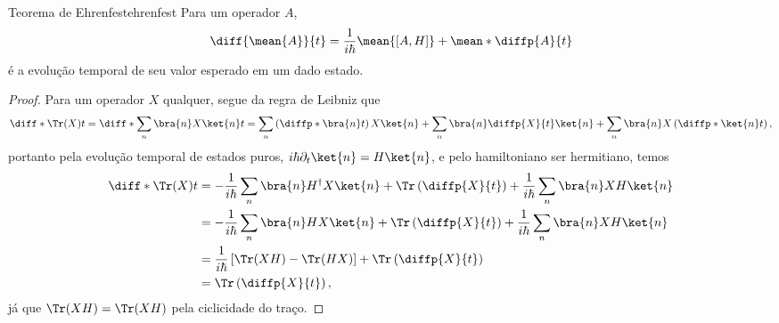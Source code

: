 \begin{theorem}{Teorema de Ehrenfest}{ehrenfest}
    Para um operador \(A\), 
    \begin{equation*}
       \diff{\mean{A}}{t} = \frac{1}{i \hbar} \mean{[A, H]} + \mean*{\diffp{A}{t}}
    \end{equation*}
    é a evolução temporal de seu valor esperado em um dado estado.
\end{theorem}
\begin{proof}
   Para um operador \(X\) qualquer, segue da regra de Leibniz que
   \begin{equation*}
      \diff*{\Tr(X)}{t} = \diff*{\sum_{n} \bra{n}X\ket{n}}{t} = \sum_{n} \left(\diffp*{\bra{n}}{t}\right)X \ket{n} + \sum_{n} \bra{n} \diffp{X}{t} \ket{n} + \sum_{n} \bra{n}X \left(\diffp*{\ket{n}}{t}\right),
   \end{equation*}
   portanto pela evolução temporal de estados puros, \(i \hbar \partial_t \ket{n} = H \ket{n}\), e pelo hamiltoniano ser hermitiano, temos
   \begin{align*}
      \diff*{\Tr(X)}{t} &= - \frac{1}{i \hbar} \sum_n \bra{n} H^\dag X \ket{n} + \Tr\left(\diffp{X}{t}\right) + \frac{1}{i \hbar}\sum_n \bra{n} X H \ket{n}\\
                        &= -\frac{1}{i \hbar} \sum_{n} \bra{n}HX \ket{n} + \Tr\left(\diffp{X}{t}\right) + \frac{1}{i \hbar} \sum_n \bra{n} XH \ket{n}\\
                        &= \frac{1}{i \hbar} \left[\Tr(XH) - \Tr(HX)\right] + \Tr\left(\diffp{X}{t}\right)\\
                        &= \Tr\left(\diffp{X}{t}\right),
   \end{align*}
   já que \(\Tr(XH) = \Tr(XH)\) pela ciclicidade do traço.


\end{proof}
